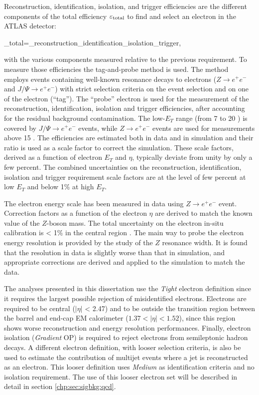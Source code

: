 Reconstruction, identification, isolation, and trigger efficiencies are the different components of the total efficiency $\epsilon_{\rm total}$ to find and select an electron in the ATLAS detector:

\be
\epsilon_{\rm total}=\epsilon_{\rm reconstruction}\times \epsilon_{\rm identification}\times \epsilon_{\rm isolation}\times \epsilon_{\rm trigger},
\ee

\noindent with the various components measured relative to the previous requirement. To measure those efficiencies the tag-and-probe method is used.
The method employs events containing well-known resonance decays to electrons ($Z\to e^{+}e^{-}$ and $J/\Psi\to e^{+}e^{-}$) with strict selection criteria on the event selection and on one of the electron (``tag''). The ``probe'' electron is used for the measurement of the reconstruction, identification, isolation
and trigger efficiencies, after accounting for the residual background contamination. The low-$E_T$ range (from 7 to 20 \gev) is covered by $J/\Psi\to e^{+}e^{-}$ events, while $Z\to e^{+}e^{-}$ events are used for measurements above 15 \gev. The efficiencies are estimated both in data and in simulation and their ratio is used as a scale factor to correct the simulation. These scale factors, derived as a function of electron $E_T$ and $\eta$, typically deviate from unity by only a few percent. The combined uncertainties on the reconstruction, identification, isolation and trigger requirement scale factors are at the level of few percent at low $E_T$ and below 1$\%$ at high $E_T$.\par
The electron energy scale has been measured in data using $Z\to e^{+}e^{-}$ event. Correction factors as a function of the electron $\eta$ are derived to match the known value of the $Z$-boson mass. The total uncertainty on the electron in-situ calibration is < 1$\%$ in the central region \cite{ATLAS-CONF-2016-024}. The main way to probe the electron energy resolution is provided by the study of the $Z$ resonance width. It is found that the resolution in data is slightly worse than that in simulation, and appropriate corrections are derived and applied to the simulation to match the data.\par
The analyses presented in this dissertation use the {\sl Tight} electron definition since it requires the largest possible rejection of misidentified electrons. Electrons are required to be central ($|\eta|$ < 2.47) and to be outside the transition region between the barrel and end-cap EM calorimeter ($1.37 <|\eta| < 1.52$), since this region shows worse reconstruction and energy resolution performances. Finally, electron isolation (\emph{Gradient} OP) is required to reject electrons from semileptonic hadron decays. A different electron definition, with looser selection criteria, is also be used to estimate the contribution of multijet events where a jet is reconstructed as an electron. This looser definition uses \emph{Medium} as identification criteria and no isolation requirement. The use of this looser electron set will be described in detail in section \ref{chp:sec:sigbkg:qcd}.


